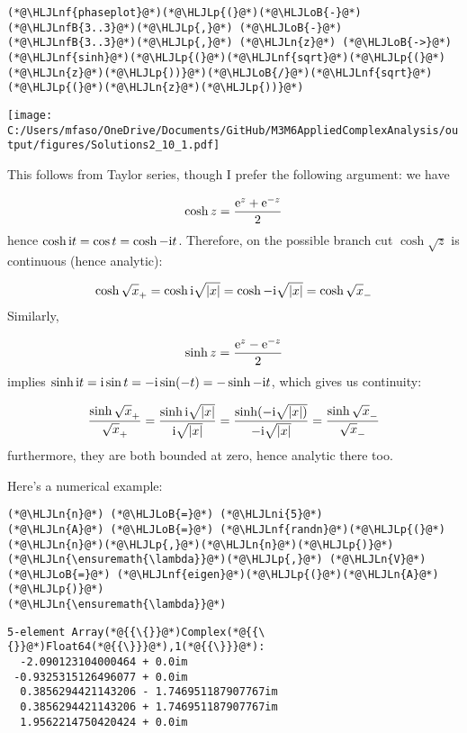 \documentclass[12pt,a4paper]{article}
\newcommand{\HLJLn}[1]{#1}
\newcommand{\HLJLnf}[1]{\textcolor[RGB]{66,102,213}{#1}}
\newcommand{\HLJLnfB}[1]{\textcolor[RGB]{59,151,46}{#1}}
\newcommand{\HLJLni}[1]{\textcolor[RGB]{59,151,46}{#1}}
\newcommand{\HLJLoB}[1]{\textcolor[RGB]{102,102,102}{\textbf{#1}}}
\newcommand{\HLJLp}[1]{#1}
\def\I{ {\rm i} }
\def\E{ {\rm e} }
\begin{document}
\begin{lstlisting}
(*@\HLJLnf{phaseplot}@*)(*@\HLJLp{(}@*)(*@\HLJLoB{-}@*)(*@\HLJLnfB{3..3}@*)(*@\HLJLp{,}@*) (*@\HLJLoB{-}@*)(*@\HLJLnfB{3..3}@*)(*@\HLJLp{,}@*) (*@\HLJLn{z}@*) (*@\HLJLoB{->}@*) (*@\HLJLnf{sinh}@*)(*@\HLJLp{(}@*)(*@\HLJLnf{sqrt}@*)(*@\HLJLp{(}@*)(*@\HLJLn{z}@*)(*@\HLJLp{))}@*)(*@\HLJLoB{/}@*)(*@\HLJLnf{sqrt}@*)(*@\HLJLp{(}@*)(*@\HLJLn{z}@*)(*@\HLJLp{))}@*)
\end{lstlisting}

\texttt{[image: C:/Users/mfaso/OneDrive/Documents/GitHub/M3M6AppliedComplexAnalysis/output/figures/Solutions2\_10\_1.pdf]}

This follows from Taylor series, though I prefer the following argument: we have

\[
\cosh z = {\E^{z} + \E^{-z} \over 2}
\]
hence $\cosh{\I t } = \cos t = \cosh{-\I t}$. Therefore, on the possible branch cut $\cosh \sqrt z$ is continuous (hence analytic):

\[
\cosh \sqrt{x}_+ = \cosh \I \sqrt{|x|} = \cosh -\I \sqrt{|x|} = \cosh\sqrt{x}_-
\]
Similarly,

\[
\sinh z = {\E^z - \E^{-z} \over 2}
\]
implies $\sinh{\I t} = \I \sin t = - \I \sin(-t) = -\sinh{-\I t}$, which gives us continuity:

\[
{\sinh \sqrt{x}_+ \over \sqrt{x}_+} = {\sinh \I \sqrt{|x|} \over \I \sqrt{|x|}} = {\sinh(-\I \sqrt{|x|)} \over -\I \sqrt{|x|}} ={\sinh \sqrt{x}_- \over \sqrt{x}_-}
\]
furthermore, they are both bounded at zero, hence analytic there too.

Here's a numerical example:


\begin{lstlisting}
(*@\HLJLn{n}@*) (*@\HLJLoB{=}@*) (*@\HLJLni{5}@*)
(*@\HLJLn{A}@*) (*@\HLJLoB{=}@*) (*@\HLJLnf{randn}@*)(*@\HLJLp{(}@*)(*@\HLJLn{n}@*)(*@\HLJLp{,}@*)(*@\HLJLn{n}@*)(*@\HLJLp{)}@*)
(*@\HLJLn{\ensuremath{\lambda}}@*)(*@\HLJLp{,}@*) (*@\HLJLn{V}@*) (*@\HLJLoB{=}@*) (*@\HLJLnf{eigen}@*)(*@\HLJLp{(}@*)(*@\HLJLn{A}@*)(*@\HLJLp{)}@*)
(*@\HLJLn{\ensuremath{\lambda}}@*)
\end{lstlisting}

\begin{lstlisting}
5-element Array(*@{{\{}}@*)Complex(*@{{\{}}@*)Float64(*@{{\}}}@*),1(*@{{\}}}@*):
  -2.090123104000464 + 0.0im
 -0.9325315126496077 + 0.0im
  0.3856294421143206 - 1.746951187907767im
  0.3856294421143206 + 1.746951187907767im
  1.9562214750420424 + 0.0im
\end{lstlisting}
\end{document}
